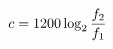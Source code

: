 \documentclass[preview]{standalone}
\begin{document}
\begin{align*}
\special{dvisvgm:raw <g id='unique000'>}c = 1200\log_2\frac{f_2}{f_1}\special{dvisvgm:raw </g>}
\end{align*}
\end{document}

